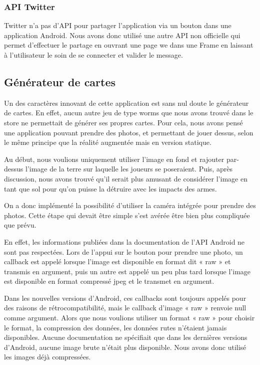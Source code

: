 \documentclass{report}
\begin{document}
\subsubsection{API Twitter}

Twitter n’a pas d’API pour partager l’application via un bouton dans une
application Android. Nous avons donc utilisé une autre API non
officielle qui permet d’effectuer le partage en ouvrant une page we
 dans une Frame en laissant à l’utilisateur le soin de se connecter et
 valider le message.

\subsection{Générateur de cartes}
\bigskip


Un des caractères innovant de cette application est sans nul doute le
générateur de cartes.
En effet, aucun autre jeu de type worms que nous avons trouvé dans le
store ne permettait de générer ses propres cartes. Pour cela, nous avons
pensé une application pouvant prendre des photos, et permettant de jouer
dessus, selon le même principe que la réalité augmentée mais en version
statique.
\bigskip

Au début, nous voulions uniquement utiliser l'image en fond et rajouter
par-dessus l'image de la terre sur laquelle les joueurs se poseraient.
Puis, après discussion, nous avons trouvé qu'il serait plus amusant de
considérer l'image en tant que sol pour qu'on puisse la détruire avec
les impacts des armes.
\bigskip

On a donc implémenté la possibilité d'utiliser la caméra intégrée pour
prendre des photos. Cette étape qui devait être simple s'est avérée être
bien plus compliquée que prévu.

En effet, les informations publiées dans
la documentation de l'API Android ne sont pas respectées. Lors de
l'appui sur le bouton pour prendre une photo, un callback est appelé
lorsque l'image est disponible en format dit « raw » et transmis en
argument, puis un autre est appelé un peu plus tard lorsque l'image est
disponible en format compressé jpeg et le transmet en argument.

Dans les nouvelles versions d'Android, ces callbacks sont toujours
appelés pour des raisons de rétrocompatibilité, mais le callback
d'image « raw » renvoie null comme argument. Alors que nous voulions
utiliser un format « raw » pour choisir le format, la compression des
données, les données rutes n'étaient jamais disponibles. Aucune
documentation ne spécifiait que dans les dernières versions d'Android,
aucune image brute n'était plus disponible. Nous avons donc utilisé les
images déjà compressées.
\bigskip
\end{document}
